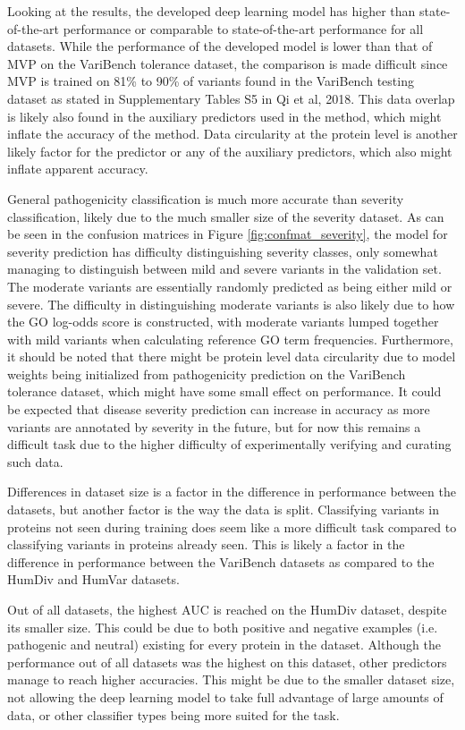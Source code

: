 \documentclass[11pt]{article}
\begin{document}
Looking at the results, the developed deep learning model has higher than state-of-the-art performance or comparable to state-of-the-art performance for all datasets. While the performance of the developed model is lower than that of MVP on the VariBench tolerance dataset, the comparison is made difficult since MVP is trained on 81\% to 90\% of variants found in the VariBench testing dataset as stated in Supplementary Tables S5 in Qi et al, 2018\cite{qi2018mvp}. This data overlap is likely also found in the auxiliary predictors used in the method, which might inflate the accuracy of the method. Data circularity at the protein level is another likely factor for the predictor or any of the auxiliary predictors, which also might inflate apparent accuracy.

General pathogenicity classification is much more accurate than severity classification, likely due to the much smaller size of the severity dataset. As can be seen in the confusion matrices in Figure \ref{fig:confmat_severity}, the model for severity prediction has difficulty distinguishing severity classes, only somewhat managing to distinguish between mild and severe variants in the validation set. The moderate variants are essentially randomly predicted as being either mild or severe. The difficulty in distinguishing moderate variants is also likely due to how the GO log-odds score is constructed, with moderate variants lumped together with mild variants when calculating reference GO term frequencies. Furthermore, it should be noted that there might be protein level data circularity due to model weights being initialized from pathogenicity prediction on the VariBench tolerance dataset, which might have some small effect on performance. It could be expected that disease severity prediction can increase in accuracy as more variants are annotated by severity in the future, but for now this remains a difficult task due to the higher difficulty of experimentally verifying and curating such data. 

Differences in dataset size is a factor in the difference in performance between the datasets, but another factor is the way the data is split. Classifying variants in proteins not seen during training does seem like a more difficult task compared to classifying variants in proteins already seen. This is likely a factor in the difference in performance between the VariBench datasets as compared to the HumDiv and HumVar datasets.

Out of all datasets, the highest AUC is reached on the HumDiv dataset, despite its smaller size. This could be due to both positive and negative examples (i.e. pathogenic and neutral) existing for every protein in the dataset. Although the performance out of all datasets was the highest on this dataset, other predictors manage to reach higher accuracies. This might be due to the smaller dataset size, not allowing the deep learning model to take full advantage of large amounts of data, or other classifier types being more suited for the task.
\end{document}
